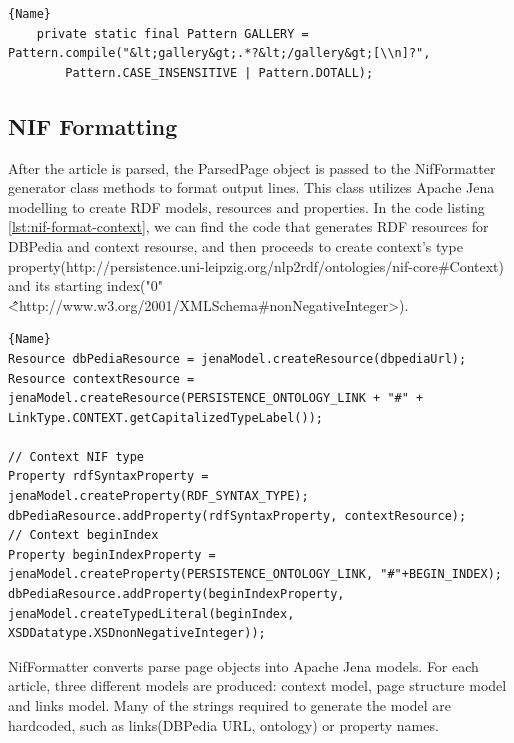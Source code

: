 \documentclass[thesis=M,english,hidelinks]{FITthesis}[2019/12/23]
\begin{document}
\begin{lstlisting}[caption=Example of a regular expression,frame=tlrb,  label = {lst:code-regex}]{Name}
	private static final Pattern GALLERY = Pattern.compile("&lt;gallery&gt;.*?&lt;/gallery&gt;[\\n]?",
		Pattern.CASE_INSENSITIVE | Pattern.DOTALL);
\end{lstlisting}

\subsection{NIF Formatting}

After the article is parsed, the ParsedPage object is passed to the NifFormatter generator class methods to format output lines. This class utilizes Apache Jena modelling to create \gls{RDF} models, resources and properties. In the code listing \ref{lst:nif-format-context}, we can find the code that generates \gls{RDF} resources for DBPedia and context resourse, and then proceeds to create context's type property(http://persistence.uni-leipzig.org/nlp2rdf/ontologies/nif-core\#Context) and its starting index("0"\^\^<http://www.w3.org/2001/XMLSchema\#nonNegativeInteger>).

\begin{lstlisting}[caption=Generating Apache Jena context model,frame=tlrb,  label = {lst:nif-format-context}]{Name}
Resource dbPediaResource = jenaModel.createResource(dbpediaUrl);
Resource contextResource = jenaModel.createResource(PERSISTENCE_ONTOLOGY_LINK + "#" + LinkType.CONTEXT.getCapitalizedTypeLabel());

// Context NIF type
Property rdfSyntaxProperty = jenaModel.createProperty(RDF_SYNTAX_TYPE);
dbPediaResource.addProperty(rdfSyntaxProperty, contextResource);
// Context beginIndex
Property beginIndexProperty = jenaModel.createProperty(PERSISTENCE_ONTOLOGY_LINK, "#"+BEGIN_INDEX);
dbPediaResource.addProperty(beginIndexProperty, jenaModel.createTypedLiteral(beginIndex, XSDDatatype.XSDnonNegativeInteger));
\end{lstlisting}

NifFormatter converts parse page objects into Apache Jena models. For each article, three different models are produced: context model, page structure model and links model. Many of the strings required to generate the model are hardcoded, such as links(DBPedia URL, ontology) or property names. 
\end{document}
